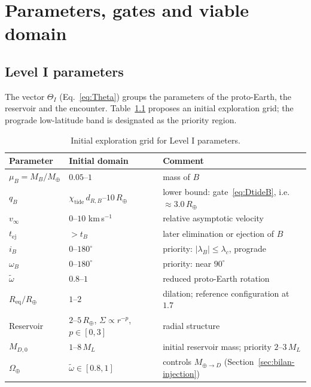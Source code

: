\documentclass[11pt,a4paper,openany]{report}
\newcommand{\Mt}{M_{\oplus}}
\newcommand{\Rt}{R_{\oplus}}
\newcommand{\Req}{R_{\mathrm{eq}}}
\begin{document}
\chapter{Parameters, gates and viable domain}
\label{ch:portes}

\section{Level I parameters}

The vector $\Theta_I$ (Eq.~\eqref{eq:Theta}) groups the parameters of the proto-Earth, the
reservoir and the encounter. Table~\ref{tab:grille} proposes an initial exploration grid; the
prograde low-latitude band is designated as the priority region.

\begin{table}[htbp]
\centering
\small
\caption{Initial exploration grid for Level I parameters.}
\label{tab:grille}
\begin{tabular}{lll}
\toprule
\textbf{Parameter} & \textbf{Initial domain} & \textbf{Comment} \\
\midrule
$\mu_B=M_B/\Mt$ & $0.05$--$1$ & mass of $B$ \\
$q_B$ & $\chi_{\mathrm{tide}}\,d_{R,B}$--$10\,\Rt$ & lower bound: gate~\eqref{eq:DtideB}, i.e. $\approx3.0\,\Rt$ \\
$v_\infty$ & $0$--$10$ km\,s$^{-1}$ & relative asymptotic velocity \\
$t_{\mathrm{ej}}$ & $>t_B$ & later elimination or ejection of $B$ \\
$i_B$ & $0$--$180^\circ$ & priority: $|\lambda_B|\le\lambda_c$, prograde \\
$\omega_B$ & $0$--$180^\circ$ & priority: near $90^\circ$ \\
$\tilde\omega$ & $0.8$--$1$ & reduced proto-Earth rotation \\
$\Req/\Rt$ & $1$--$2$ & dilation; reference configuration at $1.7$ \\
Reservoir & $2$--$5\,\Rt$, $\Sigma\propto r^{-p}$, $p\in[0,3]$ & radial structure \\
$M_{D,0}$ & $1$--$8\,M_L$ & initial reservoir mass; priority $2$--$3\,M_L$ \\
$\Omega_\oplus$ & $\tilde\omega\in[0.8,1]$ & controls $M_{\oplus\to D}$ (Section~\ref{sec:bilan-injection}) \\
\bottomrule
\end{tabular}
\end{table}
\end{document}
